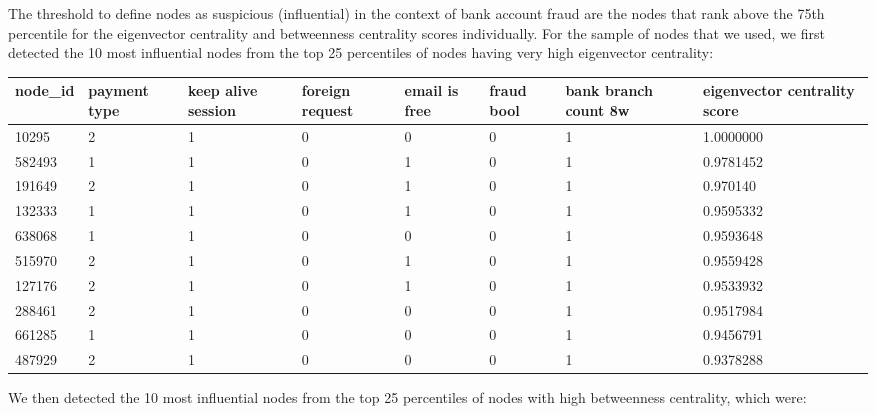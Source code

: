\documentclass{styles/svproc}
\begin{document}
The threshold to define nodes as suspicious (influential) in the context of bank account fraud are the nodes that rank above the 75th percentile for the eigenvector centrality and betweenness centrality scores individually. For the sample of nodes that we used, we first detected the 10 most influential nodes from the top 25 percentiles of nodes having very high eigenvector centrality:

\noindent
\begin{tabular}{ | m{2cm} | m{1.5cm}| m{1.2cm}| m{1.2cm}| m{1.2cm}| m{1.1cm}| m{1.2cm}| m{2.1cm}|} 
  \hline
  \textbf{node\_id} & \textbf{payment type} & \textbf{keep alive session} & \textbf{foreign request} &  \textbf{email is free} & \textbf{fraud bool} & \textbf{bank branch count 8w} & \textbf{eigenvector centrality score}\\ 
  \hline
   10295 & 2 & 1 & 0 & 0 & 0 & 1 & 1.0000000\\ 
  \hline
  582493 & 1 & 1 & 0 & 1 & 0 & 1 & 0.9781452\\ 
  \hline
  191649 & 2 & 1 & 0 & 1 & 0 & 1 & 0.970140\\
  \hline
  132333 & 1 & 1 & 0 & 1 & 0 & 1 & 0.9595332\\
  \hline
  638068 & 1 & 1 & 0 & 0 & 0 & 1 & 0.9593648\\
  \hline
  515970 & 2 & 1 & 0 & 1 & 0 & 1 & 0.9559428\\
  \hline
  127176 & 2 & 1 & 0 & 1 & 0 & 1 & 0.9533932\\
  \hline
  288461 & 2 & 1 & 0 & 0 & 0 & 1 & 0.9517984\\
  \hline
  661285 & 1 & 1 & 0 & 0 & 0 & 1 & 0.9456791\\
  \hline
  487929 & 2 & 1 & 0 & 0 & 0 & 1 & 0.9378288\\
  \hline
\end{tabular}


\noindent We then detected the 10 most influential nodes from the top 25 percentiles of nodes with high betweenness centrality, which were:
\end{document}
